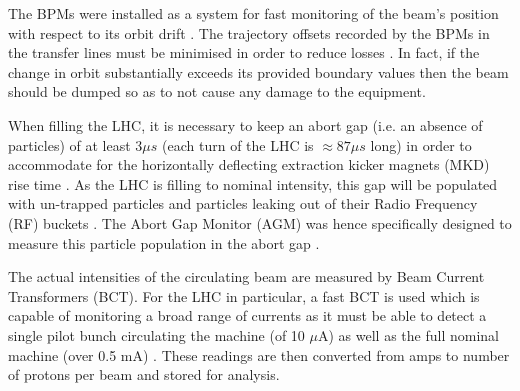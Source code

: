 \documentclass[conference, a4paper]{IEEEtran}
\begin{document}
	\par The BPMs were installed as a system for fast monitoring of the beam's position with respect to its orbit drift \cite{Schmidt2006}. The trajectory offsets recorded by the BPMs in the transfer lines must be minimised in order to reduce losses \cite{Drosdal2011}. In fact, if the change in orbit substantially exceeds its provided boundary values then the beam should be dumped \cite{Schmidt2006} so as to not cause any damage to the equipment.
	
	\par When filling the LHC, it is necessary to keep an abort gap (i.e. an absence of particles) of at least 3$\mu s$ (each turn of the LHC is $\approx87\mu s$ long) in order to accommodate for the horizontally deflecting extraction kicker magnets (MKD) rise time \cite{Meddahi2010}. As the LHC is filling to nominal intensity, this gap will be populated with un-trapped particles and particles leaking out of their Radio Frequency (RF) buckets \cite{Meddahi2010}. The Abort Gap Monitor (AGM) was hence specifically designed to measure this particle population in the abort gap \cite{Lefevre2010}.
	
	\par The actual intensities of the circulating beam are measured by Beam Current Transformers (BCT). For the LHC in particular, a fast BCT is used which is capable of monitoring a broad range of currents as it must be able to detect a single pilot bunch circulating the machine (of 10 $\mu$A) as well as the full nominal machine (over 0.5 mA) \cite{Jones2007}. These readings are then converted from amps to number of protons per beam and stored for analysis. 
	
	
%	
	
\end{document}
